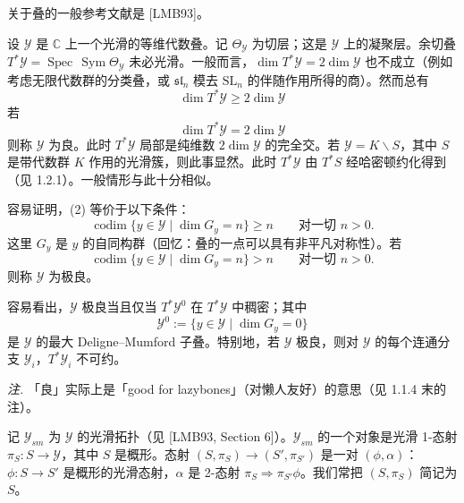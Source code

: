 

关于叠的一般参考文献是 [LMB93]。

 设 $\mathcal{Y}$ 是 $\mathbb{C}$ 上一个光滑的等维代数叠。记 $\Theta_{\mathcal{Y}}$ 为切层；这是 $\mathcal{Y}$ 上的凝聚层。余切叠 $T^{*}\mathcal{Y}=\operatorname{Spec}\,\operatorname{Sym}\Theta_{\mathcal{Y}}$ 未必光滑。一般而言，$\dim T^{*}\mathcal{Y}=2\dim\mathcal{Y}$ 也不成立（例如考虑无限代数群的分类叠，或 $\mathfrak{sl}_n$ 模去 $\mathrm{SL}_n$ 的伴随作用所得的商）。然而总有
\begin{equation}\tag{1}
\dim T^{*}\mathcal{Y}\ge 2\dim\mathcal{Y}
\end{equation}
若
\begin{equation}\tag{2}
\dim T^{*}\mathcal{Y}=2\dim\mathcal{Y}
\end{equation}
则称 $\mathcal{Y}$ 为良。此时 $T^{*}\mathcal{Y}$ 局部是纯维数 $2\dim\mathcal{Y}$ 的完全交。若 $\mathcal{Y}=K\backslash S$，其中 $S$ 是带代数群 $K$ 作用的光滑簇，则此事显然。此时 $T^{*}\mathcal{Y}$ 由 $T^{*}S$ 经哈密顿约化得到（见 1.2.1）。一般情形与此十分相似。

容易证明，(2) 等价于以下条件：
\begin{equation}\tag{3}
\operatorname{codim}\{y\in\mathcal{Y}\mid \dim G_y=n\}\ge n\qquad\text{对一切 }n>0.
\end{equation}
这里 $G_y$ 是 $y$ 的自同构群（回忆：叠的一点可以具有非平凡对称性）。若
\begin{equation}\tag{4}
\operatorname{codim}\{y\in\mathcal{Y}\mid \dim G_y=n\}>n\qquad\text{对一切 }n>0.
\end{equation}
则称 $\mathcal{Y}$ 为极良。

容易看出，$\mathcal{Y}$ 极良当且仅当 $T^{*}\mathcal{Y}^{0}$ 在 $T^{*}\mathcal{Y}$ 中稠密；其中
\[
\mathcal{Y}^{0}:=\{y\in\mathcal{Y}\mid \dim G_y=0\}
\]
是 $\mathcal{Y}$ 的最大 Deligne--Mumford 子叠。特别地，若 $\mathcal{Y}$ 极良，则对 $\mathcal{Y}$ 的每个连通分支 $\mathcal{Y}_i$，$T^{*}\mathcal{Y}_i$ 不可约。

\emph{注.} 「良」实际上是「good for lazybones」（对懒人友好）的意思（见 1.1.4 末的注）。


 记 $\mathcal{Y}_{sm}$ 为 $\mathcal{Y}$ 的光滑拓扑（见 [LMB93, Section 6]）。$\mathcal{Y}_{sm}$ 的一个对象是光滑 1-态射 $\pi_S:S\to\mathcal{Y}$，其中 $S$ 是概形。态射 $(S,\pi_S)\to(S',\pi_{S'})$ 是一对 $(\phi,\alpha)$：$\phi:S\to S'$ 是概形的光滑态射，$\alpha$ 是 2-态射 $\pi_S\Rightarrow\pi_{S'}\phi$。我们常把 $(S,\pi_S)$ 简记为 $S$。

